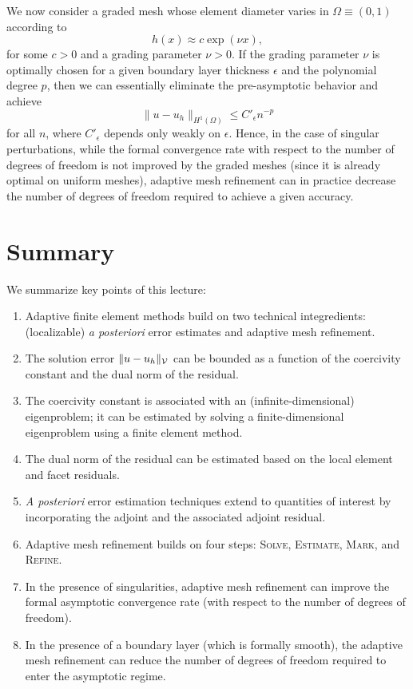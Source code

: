 We now consider a graded mesh whose element diameter varies in $\Omega \equiv (0,1)$ according to
\begin{equation*}
  h(x) \approx c \exp(\nu x),
\end{equation*}
for some $c > 0$ and a grading parameter $\nu > 0$.  If the grading parameter $\nu$ is optimally chosen for a given boundary layer thickness $\epsilon$ and the polynomial degree $p$, then we can essentially eliminate the pre-asymptotic behavior and achieve
\begin{equation*}
  \| u - u_h \|_{H^1(\Omega)} \leq C'_{\epsilon} n^{-p}
\end{equation*}
for all $n$, where $C'_{\epsilon}$ depends only weakly on $\epsilon$. Hence, in the case of singular perturbations, while the formal convergence rate with respect to the number of degrees of freedom is not improved by the graded meshes (since it is already optimal on uniform meshes), adaptive mesh refinement can in practice decrease the number of degrees of freedom required to achieve a given accuracy.

\section{Summary}
We summarize key points of this lecture:
\begin{enumerate}
\item Adaptive finite element methods build on two technical integredients: (localizable) \emph{a posteriori} error estimates and adaptive mesh refinement.
\item The solution error $\| u - u_h \|_{\mathcal{V}}$ can be bounded as a function of the coercivity constant and the dual norm of the residual.
\item The coercivity constant is associated with an (infinite-dimensional) eigenproblem; it can be estimated by solving a finite-dimensional eigenproblem using a finite element method.
\item The dual norm of the residual can be estimated based on the local element and facet residuals.
\item \emph{A posteriori} error estimation techniques extend to quantities of interest by incorporating the adjoint and the associated adjoint residual.
\item Adaptive mesh refinement builds on four steps: \textsc{Solve}, \textsc{Estimate}, \textsc{Mark}, and \textsc{Refine}.
\item In the presence of singularities, adaptive mesh refinement can improve the formal asymptotic convergence rate (with respect to the number of degrees of freedom).
\item In the presence of a boundary layer (which is formally smooth), the adaptive mesh refinement can reduce the number of degrees of freedom required to enter the asymptotic regime.
\end{enumerate}


